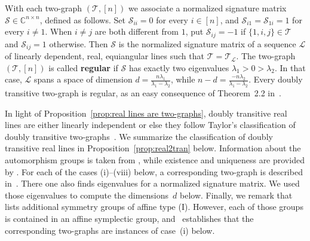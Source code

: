 \documentclass[11pt]{article}
\theoremstyle{definition}
\numberwithin{equation}{section}
\begin{document}
With each two-graph $(\mathcal{T},[n])$ we associate a normalized signature matrix $\mathcal{S} \in \mathbb{C}^{n\times n}$, defined as follows.
Set $\mathcal{S}_{ii} = 0$ for every $i \in [n]$, and $\mathcal{S}_{i1} = \mathcal{S}_{1i} = 1$ for every $i \neq 1$.
When $i \neq j$ are both different from $1$, put $\mathcal{S}_{ij} = -1$ if $\{ 1 ,i ,j \} \in \mathcal{T}$ and $\mathcal{S}_{ij} = 1$ otherwise.
Then $\mathcal{S}$ is the normalized signature matrix of a sequence $\mathscr{L}$ of linearly dependent, real, equiangular lines such that $\mathcal{T} = \mathcal{T}_{\mathscr{L}}$.
The two-graph $(\mathcal{T},[n])$ is called \textbf{regular} if $\mathcal{S}$ has exactly two eigenvalues $\lambda_1 > 0 > \lambda_2$.
In that case, $\mathscr{L}$ spans a space of dimension $d = \frac{n\lambda_1}{\lambda_1 - \lambda_2}$, while $n-d = \frac{-n\lambda_2}{\lambda_1 - \lambda_2}$.
Every doubly transitive two-graph is regular, as an easy consequence of Theorem~2.2 in~\cite{Taylor:77}.


In light of Proposition~\ref{prop:real lines are two-graphs}, doubly transitive real lines are either linearly independent or else they follow Taylor's classification of doubly transitive two-graphs~\cite{Taylor:92}.
We summarize the classification of doubly transitive real lines in Proposition~\ref{prop:real2tran} below.
Information about the automorphism groups is taken from \cite[Theorem~1]{Taylor:92}, while existence and uniqueness are provided by \cite[Theorem~2]{Taylor:92}.
For each of the cases (i)--(viii) below, a corresponding two-graph is described in~\cite[Section~6]{Taylor:77}.
There one also finds eigenvalues for a normalized signature matrix.
We used those eigenvalues to compute the dimensions~$d$ below.
Finally, we remark that \cite[Theorem~1]{Taylor:92} lists additional symmetry groups of affine type (I).
However, each of those groups is contained in an affine symplectic group, and~\cite[Section~3]{Taylor:92} establishes that the corresponding two-graphs are instances of case~(i) below.
\end{document}
